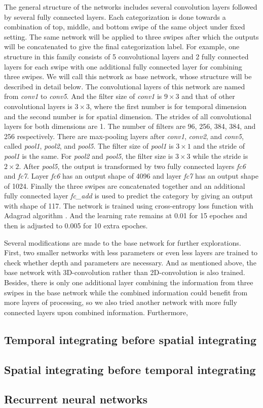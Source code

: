The general structure of the networks includes several convolution layers followed by several fully connected layers. Each categorization is done towards a combination of top, middle, and bottom swipe of the same object under fixed setting.
The same network will be applied to three swipes after which the outputs will be concatenated to give the final categorization label.
For example, one structure in this family consists of 5 convolutional layers and 2 fully connected layers for each swipe with one additional fully connected layer for combining three swipes.
We will call this network as base network, whose structure will be described in detail below.
The convolutional layers of this network are named from \textit{conv1} to \textit{conv5}.
And the filter size of \textit{conv1} is $9\times3$ and that of other convolutional layers is $3\times3$, where the first number is for temporal dimension and the second number is for spatial dimension.
The strides of all convolutional layers for both dimensions are 1. The number of filters are 96, 256, 384, 384, and 256 respectively.
There are max-pooling layers after \textit{conv1}, \textit{conv2}, and \textit{conv5}, called \textit{pool1}, \textit{pool2}, and \textit{pool5}. The filter size of \textit{pool1} is $3\times1$ and the stride of \textit{pool1} is the same.
For \textit{pool2} and \textit{pool5}, the filter size is $3\times3$ while the stride is $2\times2$.
After \textit{pool5}, the output is transformed by two fully connected layers \textit{fc6} and \textit{fc7}. Layer \textit{fc6} has an output shape of 4096 and layer \textit{fc7} has an output shape of 1024.
Finally the three swipes are concatenated together and an additional fully connected layer \textit{fc_add} is used to predict the category by giving an output with shape of 117.
The network is trained using cross-entropy loss function with Adagrad algorithm \cite{duchi2011adaptive}.
And the learning rate remains at 0.01 for 15 epoches and then is adjusted to 0.005 for 10 extra epoches.

Several modifications are made to the base network for further explorations. First, two smaller networks with less parameters or even less layers are trained to check whether depth and parameters are necessary.
And as mentioned above, the base network with 3D-convolution rather than 2D-convolution is also trained.
Besides, there is only one additional layer combining the information from three swipes in the base network while the combined information could benefit from more layers of processing, so we also tried another network with more fully connected layers upon combined information.
Furthermore, 



\subsection{Temporal integrating before spatial integrating}



\subsection{Spatial integrating before temporal integrating}

\subsection{Recurrent neural networks}
